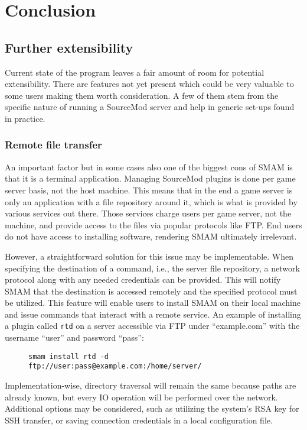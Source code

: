 \chapter{Conclusion}

\section{Further extensibility}

Current state of the program leaves a fair amount of room for potential extensibility.
There are features not yet present which could be very valuable to some users making them worth consideration.
A few of them stem from the specific nature of running a SourceMod server and help in generic set-ups found in practice.

\subsection{Remote file transfer}

An important factor but in some cases also one of the biggest cons of SMAM is that it is a terminal application.
Managing SourceMod plugins is done per game server basis, not the host machine.
This means that in the end a game server is only an application with a file repository around it, which is what is provided by various services out there.
Those services charge users per game server, not the machine, and provide access to the files via popular protocols like FTP\@.
End users do not have access to installing software, rendering SMAM ultimately irrelevant.

However, a straightforward solution for this issue may be implementable.
When specifying the destination of a command, i.e., the server file repository, a network protocol along with any needed credentials can be provided.
This will notify SMAM that the destination is accessed remotely and the specified protocol must be utilized.
This feature will enable users to install SMAM on their local machine and issue commands that interact with a remote service.
An example of installing a plugin called \verb|rtd| on a server accessible via FTP under ``example.com'' with the username ``user'' and password ``pass'':

\begin{figure}[htp]
\centering
\verb|smam install rtd -d ftp://user:pass@example.com:/home/server/|
\end{figure}

Implementation-wise, directory traversal will remain the same because paths are already known, but every IO operation will be performed over the network.
Additional options may be considered, such as utilizing the system's RSA key for SSH transfer, or saving connection credentials in a local configuration file.


